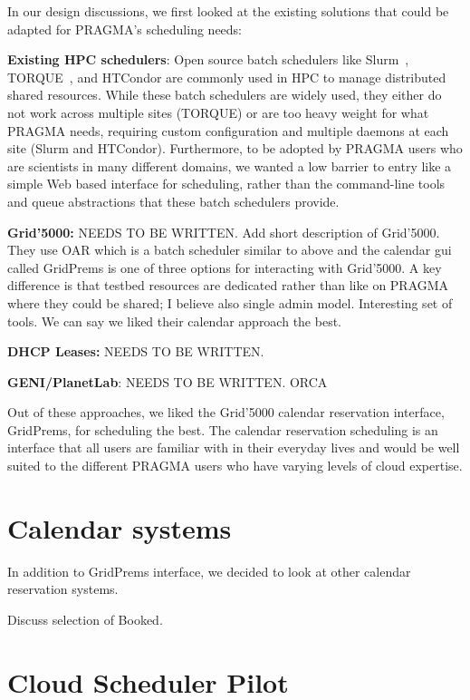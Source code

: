 \documentclass{acm_proc_article-sp}
\begin{document}
In our design discussions, we first looked at the existing solutions that could be adapted for PRAGMA's scheduling needs:

\textbf{Existing HPC schedulers}:  Open source batch schedulers like Slurm~\cite{slurm}, TORQUE~\cite{torque}, and HTCondor are commonly used in  HPC to manage distributed  shared resources.  While these batch schedulers  are widely used, they either do not work across multiple sites (TORQUE) or are too heavy weight for what PRAGMA needs, requiring custom configuration and multiple daemons at each site (Slurm and HTCondor).  Furthermore, to be adopted by PRAGMA users who are scientists in many different domains,  we wanted a low barrier to entry like a simple Web based interface for scheduling, rather than the command-line tools and queue abstractions that these batch schedulers provide.

\textbf{Grid'5000:}   NEEDS TO BE WRITTEN.  Add short description of Grid'5000.  They use OAR which is a batch scheduler similar to above and the calendar gui called GridPrems is one of three options for interacting with Grid'5000.  A key difference is that testbed resources are dedicated rather than like on PRAGMA where they could be shared;  I believe also single admin model.  Interesting set of tools.  We can say we liked their calendar approach the best.

\textbf{DHCP Leases:}  NEEDS TO BE WRITTEN.

\textbf{GENI/PlanetLab}:  NEEDS TO BE WRITTEN.  ORCA

Out of these approaches, we liked the Grid'5000 calendar reservation interface, GridPrems, for scheduling the best.  The calendar reservation scheduling is an interface that all users are familiar with in their everyday lives and would be well suited to the different PRAGMA users who have varying levels of cloud expertise.  

\section{Calendar systems}
\label{Sec:Calendars}

In addition to GridPrems interface, we decided to look at other calendar reservation systems. 

Discuss selection of Booked.

\section{Cloud Scheduler Pilot}
\label{Sec:Pilot}
\end{document}
